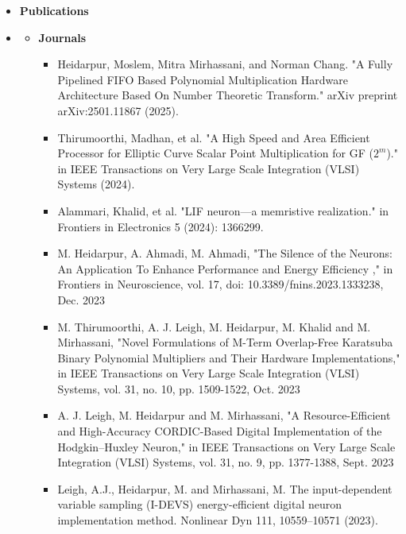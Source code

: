 \begin {itemize} 
    \item [] {\bf \Large  Publications  }  \vspace{-1.5em}
    \item []  {\bf \hrulefill } \mdseries \normalsize 
        \begin {itemize}
            \item [$\bullet$] \bf {\mtf \normalsize  Journals} \mdseries
                \begin {itemize}
                    \item [-] Heidarpur, Moslem, Mitra Mirhassani, and Norman Chang. "A Fully Pipelined FIFO Based Polynomial Multiplication Hardware Architecture Based On Number Theoretic Transform." arXiv preprint arXiv:2501.11867 (2025).
                    \item [-] Thirumoorthi, Madhan, et al. "A High Speed and Area Efficient Processor for Elliptic Curve Scalar Point Multiplication for GF ($2^ m $)." in IEEE Transactions on Very Large Scale Integration (VLSI) Systems (2024).
                    \item [-] Alammari, Khalid, et al. "LIF neuron—a memristive realization." in  Frontiers in Electronics 5 (2024): 1366299.
                     \item [-]  M. Heidarpur, A. Ahmadi, M. Ahmadi, "The Silence of the Neurons: An Application To Enhance Performance and Energy Efficiency ," in Frontiers in Neuroscience, vol. 17, doi: 10.3389/fnins.2023.1333238, Dec. 2023
                    \vspace{0.3cm}
                    \item [-]  M. Thirumoorthi, A. J. Leigh, M. Heidarpur, M. Khalid and M. Mirhassani, "Novel Formulations of M-Term Overlap-Free Karatsuba Binary Polynomial Multipliers and Their Hardware Implementations," in IEEE Transactions on Very Large Scale Integration (VLSI) Systems, vol. 31, no. 10, pp. 1509-1522, Oct. 2023
                    \vspace{0.3cm}
                    \item [-]  A. J. Leigh, M. Heidarpur and M. Mirhassani, "A Resource-Efficient and High-Accuracy CORDIC-Based Digital Implementation of the Hodgkin–Huxley Neuron," in IEEE Transactions on Very Large Scale Integration (VLSI) Systems, vol. 31, no. 9, pp. 1377-1388, Sept. 2023
                    \vspace{0.3cm}
                    \item [-]  Leigh, A.J., Heidarpur, M. and Mirhassani, M. The input-dependent variable sampling (I-DEVS) energy-efficient digital neuron implementation method. Nonlinear Dyn 111, 10559–10571 (2023).

\end{itemize}
\end{itemize}
\end{itemize}
